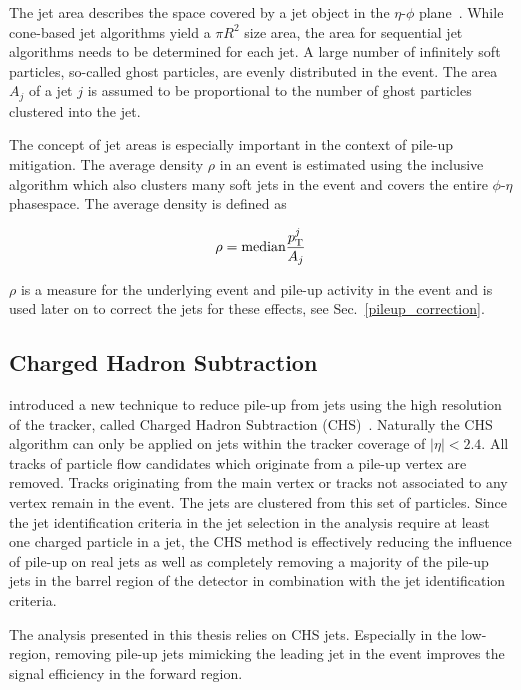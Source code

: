 The jet area describes the space covered by a jet object in the $\eta$-$\phi$
plane~\cite{Cacciari:2008gn}. While cone-based jet algorithms yield a $\pi R^2$
size area, the area for sequential jet algorithms needs to be determined for
each jet. A large number of infinitely soft particles, so-called ghost
particles, are evenly distributed in the event. The area $A_j$ of a jet $j$ is
assumed to be proportional to the number of ghost particles clustered into the
jet. 

The concept of jet areas is especially important in the context of pile-up
mitigation. The average \pt density $\rho$ in an event is estimated using the inclusive
\kt algorithm which also clusters many soft jets in the event and covers the
entire $\phi$-$\eta$ phasespace. The average \pt density is defined as

\begin{equation*}
    \rho = \text{median} \frac{p_{\mathrm{T}}^j}{A_j}
\end{equation*}

$\rho$ is a measure for the underlying event and pile-up activity in the event
and is used later on to correct the jets for these effects, see
Sec.~\ref{pileup_correction}.

\subsection{Charged Hadron Subtraction}

\CMS introduced a new technique to reduce pile-up from jets using the high
resolution of the tracker, called Charged Hadron Subtraction
(CHS)~\cite{Kirschenmann:2014dla}. Naturally the CHS algorithm can only be
applied on jets within the tracker coverage of $|\eta| < 2.4$. All tracks of
particle flow candidates which originate from a pile-up vertex are removed.
Tracks originating from the main vertex or tracks not associated to any vertex
remain in the event. The jets are clustered from this set of particles.
Since the jet identification criteria in the jet selection in the analysis
require at least one charged particle in a jet, the CHS method is effectively
reducing the influence of pile-up on real jets as well as completely removing a
majority of the pile-up jets in the barrel region of the \CMS detector in
combination with the jet identification criteria.

The analysis presented in this thesis relies on CHS jets. Especially in the
low-\pt region, removing pile-up jets mimicking the leading jet in the event
improves the signal efficiency in the forward region.

